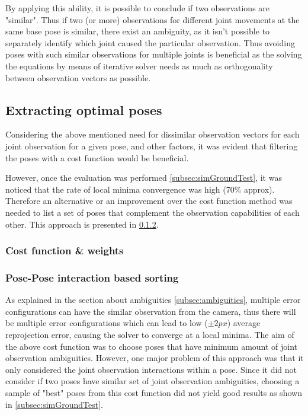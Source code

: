 \documentclass[english, printversion, nomenclature, notitle]{tuvisionthesis} %
\begin{document}
By applying this ability, it is possible to conclude if two observations are "similar". Thus if two (or more) observations for different joint movements at the same base pose is similar, there exist an ambiguity, as it isn't possible to separately identify which joint caused the particular observation. Thus avoiding poses with such similar observations for multiple joints is beneficial as the solving the equations by means of iterative solver needs as much as orthogonality between observation vectors as possible.

\subsection{Extracting optimal poses}

Considering the above mentioned need for dissimilar observation vectors for each joint observation for a given pose, and other factors, it was evident that filtering the poses with a cost function would be beneficial. 

However, once the evaluation was performed \cref{subsec:simGroundTest}, it was noticed that the rate of local minima convergence was high (70\% approx). Therefore an alternative or an improvement over the cost function method was needed to list a set of poses that complement the observation capabilities of each other. This approach is presented in \cref{subsec:posepose}.

\subsubsection{Cost function \& weights}
\label{subsec:costFunc}


\subsubsection{Pose-Pose interaction based sorting}
\label{subsec:posepose}

As explained in the section about ambiguities \cref{subsec:ambiguities}, multiple error configurations can have the similar observation from the camera, thus there will be multiple error configurations which can lead to low ($\pm2px$) average reprojection error, causing the solver to converge at a local minima. The aim of the above cost function was to choose poses that have minimum amount of joint observation ambiguities. However, one major problem of this approach was that it only considered the joint observation interactions within a pose. Since it did not consider if two poses have similar set of joint observation ambiguities, choosing a sample of "best" poses from this cost function did not yield good results as shown in \cref{subsec:simGroundTest}.
\end{document}
